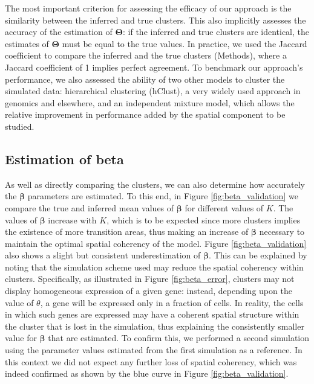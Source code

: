 	The most important criterion for assessing the efficacy of our approach is the similarity between the inferred and true clusters. This also implicitly assesses the accuracy of the estimation of $\mathbf{\Theta}$: if the inferred and true clusters are identical, the estimates of $\mathbf{\Theta}$ must be equal to the true values. In practice, we used the Jaccard coefficient to compare the inferred and the true clusters (Methods), where a Jaccard coefficient of 1 implies perfect agreement. To benchmark our approach's performance, we also assessed the ability of two other models to cluster the simulated data: hierarchical clustering (hClust), a very widely used approach in genomics and elsewhere, and an independent mixture model, which allows the relative improvement in performance added by the spatial component to be studied.\\
	
		


	\subsection{Estimation of beta}\label{subsec:beta_estimation}
	As well as directly comparing the clusters, we can also determine how accurately the $\mathbf{\beta}$ parameters are estimated. To this end, in Figure \ref{fig:beta_validation} we compare the true and inferred mean values of $\mathbf{\beta}$ for different values of $K$. The values of $\mathbf{\beta}$ increase with $K$, which is to be expected since more clusters implies the existence of more transition areas, thus making an increase of $\mathbf{\beta}$ necessary to maintain the optimal spatial coherency of the model. Figure \ref{fig:beta_validation} also shows a slight but consistent underestimation of $\mathbf{\beta}$. This can be explained by noting that the simulation scheme used may reduce the spatial coherency within clusters. Specifically, as illustrated in Figure \ref{fig:beta_error}, clusters may not display homogeneous expression of a given gene: instead, depending upon the value of $\theta$, a gene will be expressed only in a fraction of cells. In reality, the cells in which such genes are expressed may have a coherent spatial structure within the cluster that is lost in the simulation, thus explaining the consistently smaller value for $\mathbf{\beta}$ that are estimated. To confirm this, we performed a second simulation using the parameter values estimated from the first simulation as a reference. In this context we did not expect any further loss of spatial coherency, which was indeed confirmed as shown by the blue curve in Figure \ref{fig:beta_validation}.\\
	
